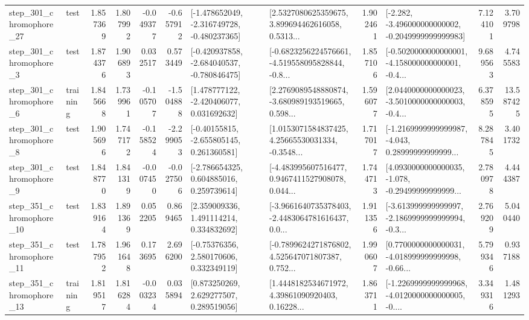 \begin{tabular}{llrrrrllrlrr}
  step\_301\_chromophore\_27 &      test &      1.857369 &    1.807992 &     -0.049377 & -0.657912 &  [-1.478652049, -2.316749728, -0.480237365] &  [2.5327080625359675, 3.899694462616058, 0.5313... &       1.902461 &  [-2.282, -3.496000000000002, -0.2049999999999983] &            7.124101 &          3.709798 \\
   step\_301\_chromophore\_3 &      test &      1.874376 &    1.906893 &      0.032517 &  0.573449 &  [-0.420937858, -2.684040537, -0.780846475] &  [-0.6823256224576661, -4.519558095828844, -0.8... &       1.857106 &  [-0.5020000000000001, -4.158000000000001, -0.4... &            9.689563 &          4.745583 \\
   step\_301\_chromophore\_6 &  training &      1.845668 &    1.739961 &     -0.105707 & -1.504888 &    [1.478777122, -2.420406077, 0.031692632] &  [2.2769089548880874, -3.680989193519665, 0.598... &       1.596077 &  [2.0440000000000023, -3.5010000000000003, -0.4... &            6.378595 &         13.587425 \\
   step\_301\_chromophore\_8 &      test &      1.905696 &    1.747172 &     -0.158524 & -2.299053 &    [-0.40155815, -2.655805145, 0.261360581] &  [1.0153071584837425, 4.25665530031334, -0.3548... &       1.717017 &  [-1.2169999999999987, -4.043, 0.28999999999999... &            8.287845 &          3.401732 \\
   step\_301\_chromophore\_9 &      test &      1.848770 &    1.841319 &     -0.007450 & -0.027506 &    [-2.786654325, 0.604885016, 0.259739614] &  [-4.483995607516477, 0.9467411527908078, 0.044... &       1.744713 &  [4.0930000000000035, -1.078, -0.29499999999999... &            2.780978 &          4.444387 \\
  step\_351\_chromophore\_10 &      test &      1.839164 &    1.891369 &      0.052205 &  0.869465 &     [2.359009336, 1.491114214, 0.334832692] &  [-3.9661640735378403, -2.4483064781616437, 0.0... &       1.911356 &  [-3.613999999999997, -2.1869999999999994, -0.3... &            2.769209 &          5.040440 \\
  step\_351\_chromophore\_11 &      test &      1.787952 &    1.961648 &      0.173695 &  2.696200 &     [-0.75376356, 2.580170606, 0.332349119] &  [-0.7899624271876802, 4.525647071807387, 0.752... &       1.990607 &  [0.7700000000000031, -4.018999999999998, -0.66... &            5.799346 &          0.937188 \\
  step\_351\_chromophore\_13 &  training &      1.819517 &    1.816284 &     -0.003234 &  0.035894 &     [0.873250269, 2.629277507, 0.289519056] &  [1.4448182534671972, 4.39861090920403, 0.16228... &       1.863711 &  [-1.2269999999999968, -4.0120000000000005, -0.... &            3.349316 &          1.481293 \\

\end{tabular}

